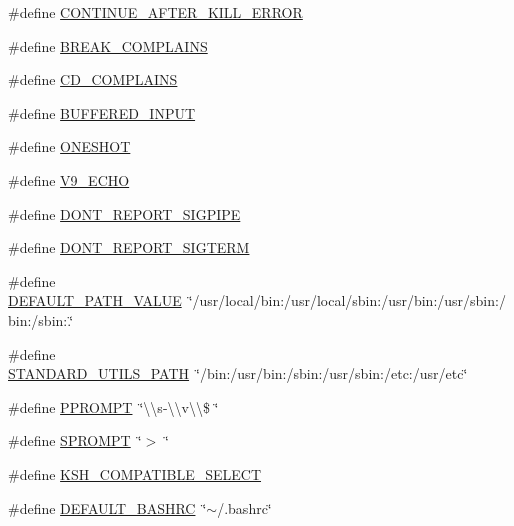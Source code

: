 \begin{DoxyCompactItemize}
\item 
\#define \hyperlink{config-top_8h_aee01ce4ffc71909f8af138267dce18b1}{C\+O\+N\+T\+I\+N\+U\+E\+\_\+\+A\+F\+T\+E\+R\+\_\+\+K\+I\+L\+L\+\_\+\+E\+R\+R\+OR}
\item 
\#define \hyperlink{config-top_8h_a9d763abc86e456a73acea0769e3e206a}{B\+R\+E\+A\+K\+\_\+\+C\+O\+M\+P\+L\+A\+I\+NS}
\item 
\#define \hyperlink{config-top_8h_a84e185c4058dd70e0f53246e5d726e73}{C\+D\+\_\+\+C\+O\+M\+P\+L\+A\+I\+NS}
\item 
\#define \hyperlink{config-top_8h_ab78c0e7855f1fb055d8213dfe60fbf03}{B\+U\+F\+F\+E\+R\+E\+D\+\_\+\+I\+N\+P\+UT}
\item 
\#define \hyperlink{config-top_8h_aeac901402270f5fc2488edc7f31cef35}{O\+N\+E\+S\+H\+OT}
\item 
\#define \hyperlink{config-top_8h_a7fbe321ade03be4d141ba882afd2798a}{V9\+\_\+\+E\+C\+HO}
\item 
\#define \hyperlink{config-top_8h_ae3449100160af1ce5f722b64493ffaf1}{D\+O\+N\+T\+\_\+\+R\+E\+P\+O\+R\+T\+\_\+\+S\+I\+G\+P\+I\+PE}
\item 
\#define \hyperlink{config-top_8h_a0884281f613019ce59b393945db49ac2}{D\+O\+N\+T\+\_\+\+R\+E\+P\+O\+R\+T\+\_\+\+S\+I\+G\+T\+E\+RM}
\item 
\#define \hyperlink{config-top_8h_acc61a569fd63c4a973bc4ce7ca19d875}{D\+E\+F\+A\+U\+L\+T\+\_\+\+P\+A\+T\+H\+\_\+\+V\+A\+L\+UE}~\char`\"{}/usr/local/bin\+:/usr/local/sbin\+:/usr/bin\+:/usr/sbin\+:/bin\+:/sbin\+:.\char`\"{}
\item 
\#define \hyperlink{config-top_8h_a6bb8777fb623e7aa3a29a32bf5acff76}{S\+T\+A\+N\+D\+A\+R\+D\+\_\+\+U\+T\+I\+L\+S\+\_\+\+P\+A\+TH}~\char`\"{}/bin\+:/usr/bin\+:/sbin\+:/usr/sbin\+:/etc\+:/usr/etc\char`\"{}
\item 
\#define \hyperlink{config-top_8h_a5bbc7fdbf76c507888114ff136f5e313}{P\+P\+R\+O\+M\+PT}~\char`\"{}\textbackslash{}\textbackslash{}s-\/\textbackslash{}\textbackslash{}v\textbackslash{}\textbackslash{}\$ \char`\"{}
\item 
\#define \hyperlink{config-top_8h_a06580247d1207158b6351b7637e6cb80}{S\+P\+R\+O\+M\+PT}~\char`\"{}$>$ \char`\"{}
\item 
\#define \hyperlink{config-top_8h_ae04e0835e5f1b886eda23564f2091f62}{K\+S\+H\+\_\+\+C\+O\+M\+P\+A\+T\+I\+B\+L\+E\+\_\+\+S\+E\+L\+E\+CT}
\item 
\#define \hyperlink{config-top_8h_ac5356018ba5511948c1ffa47982abd7c}{D\+E\+F\+A\+U\+L\+T\+\_\+\+B\+A\+S\+H\+RC}~\char`\"{}$\sim$/.bashrc\char`\"{}

\end{DoxyCompactItemize}
